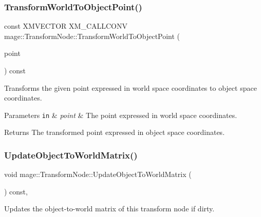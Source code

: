 \subsubsection{\texorpdfstring{Transform\+World\+To\+Object\+Point()}{TransformWorldToObjectPoint()}}
{\footnotesize\ttfamily const X\+M\+V\+E\+C\+T\+OR X\+M\+\_\+\+C\+A\+L\+L\+C\+O\+NV mage\+::\+Transform\+Node\+::\+Transform\+World\+To\+Object\+Point (\begin{DoxyParamCaption}\item[{F\+X\+M\+V\+E\+C\+T\+OR}]{point }\end{DoxyParamCaption}) const\hspace{0.3cm}{\ttfamily [noexcept]}}

Transforms the given point expressed in world space coordinates to object space coordinates.


\begin{DoxyParams}[1]{Parameters}
\mbox{\tt in}  & {\em point} & The point expressed in world space coordinates. \\
\hline
\end{DoxyParams}
\begin{DoxyReturn}{Returns}
The transformed point expressed in object space coordinates. 
\end{DoxyReturn}
\hypertarget{structmage_1_1_transform_node_a2102425a193884bea453c783388f6a38}{}\label{structmage_1_1_transform_node_a2102425a193884bea453c783388f6a38} 
\subsubsection{\texorpdfstring{Update\+Object\+To\+World\+Matrix()}{UpdateObjectToWorldMatrix()}}
{\footnotesize\ttfamily void mage\+::\+Transform\+Node\+::\+Update\+Object\+To\+World\+Matrix (\begin{DoxyParamCaption}{ }\end{DoxyParamCaption}) const\hspace{0.3cm}{\ttfamily [private]}, {\ttfamily [noexcept]}}

Updates the object-\/to-\/world matrix of this transform node if dirty. \hypertarget{structmage_1_1_transform_node_aec6309962398c128fdf3f50cbff13e89}{}\label{structmage_1_1_transform_node_aec6309962398c128fdf3f50cbff13e89} 
